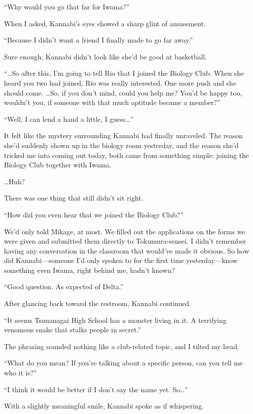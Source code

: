 \documentclass[
    a4paper,
    12pt,
    twoside,
    openany,
    UTF8,
    fontset=windows
]{ctexbook}
\begin{document}
``Why would you go that far for Iwama?''

When I asked, Kannabi's eyes showed a sharp glint of amusement.

``Because I didn't want a friend I finally made to go far away.''

Sure enough, Kannabi didn't look like she'd be good at basketball.

``\dots So after this, I'm going to tell Rio that I joined the Biology Club. When she heard you two had joined, Rio was really interested. One more push and she should come. \dots So, if you don't mind, could you help me? You'd be happy too, wouldn't you, if someone with that much aptitude became a member?''

``Well, I can lend a hand a little, I guess\dots''

It felt like the mystery surrounding Kannabi had finally unraveled. The reason she'd suddenly shown up in the biology room yesterday, and the reason she'd tricked me into coming out today, both came from something simple: joining the Biology Club together with Iwama.

\dots Huh?

There was one thing that still didn't sit right.

``How did you even hear that we joined the Biology Club?''

We'd only told Mikage, at most. We filled out the applications on the forms we were given and submitted them directly to Tokumura-sensei. I didn't remember having any conversation in the classroom that would've made it obvious. So how did Kannabi---someone I'd only spoken to for the first time yesterday---know something even Iwama, right behind me, hadn't known?

``Good question. As expected of Delta.''

After glancing back toward the restroom, Kannabi continued.

``It seems Tsunanagai High School has a monster living in it. A terrifying venomous snake that stalks people in secret.''

The phrasing sounded nothing like a club-related topic, and I tilted my head.

``What do you mean? If you're talking about a specific person, can you tell me who it is?''

``I think it would be better if I don't say the name yet. So\dots''

With a slightly meaningful smile, Kannabi spoke as if whispering.
\end{document}
